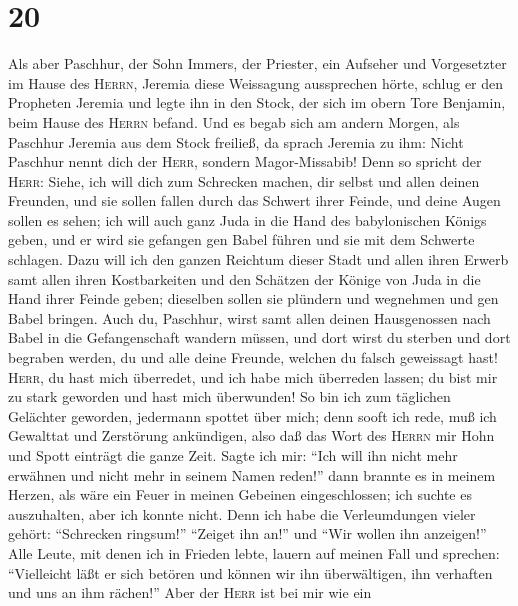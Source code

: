 \hypertarget{section-19}{%
\section{20}\label{section-19}}

 Als aber Paschhur, der Sohn Immers, der Priester, ein
Aufseher und Vorgesetzter im Hause des \textsc{Herrn}, Jeremia diese
Weissagung aussprechen hörte,  schlug er den Propheten
Jeremia und legte ihn in den Stock, der sich im obern Tore Benjamin,
beim Hause des \textsc{Herrn} befand.  Und es begab sich
am andern Morgen, als Paschhur Jeremia aus dem Stock freiließ, da sprach
Jeremia zu ihm: Nicht Paschhur nennt dich der \textsc{Herr}, sondern
Magor-Missabib!  Denn so spricht der \textsc{Herr}: Siehe,
ich will dich zum Schrecken machen, dir selbst und allen deinen
Freunden, und sie sollen fallen durch das Schwert ihrer Feinde, und
deine Augen sollen es sehen; ich will auch ganz Juda in die Hand des
babylonischen Königs geben, und er wird sie gefangen gen Babel führen
und sie mit dem Schwerte schlagen.  Dazu will ich den
ganzen Reichtum dieser Stadt und allen ihren Erwerb samt allen ihren
Kostbarkeiten und den Schätzen der Könige von Juda in die Hand ihrer
Feinde geben; dieselben sollen sie plündern und wegnehmen und gen Babel
bringen.  Auch du, Paschhur, wirst samt allen deinen
Hausgenossen nach Babel in die Gefangenschaft wandern müssen, und dort
wirst du sterben und dort begraben werden, du und alle deine Freunde,
welchen du falsch geweissagt hast!  \textsc{Herr}, du hast
mich überredet, und ich habe mich überreden lassen; du bist mir zu stark
geworden und hast mich überwunden! So bin ich zum täglichen Gelächter
geworden, jedermann spottet über mich;  denn sooft ich
rede, muß ich Gewalttat und Zerstörung ankündigen, also daß das Wort des
\textsc{Herrn} mir Hohn und Spott einträgt die ganze Zeit.
 Sagte ich mir: ``Ich will ihn nicht mehr erwähnen und
nicht mehr in seinem Namen reden!'' dann brannte es in meinem Herzen,
als wäre ein Feuer in meinen Gebeinen eingeschlossen; ich suchte es
auszuhalten, aber ich konnte nicht.  Denn ich habe die
Verleumdungen vieler gehört: ``Schrecken ringsum!'' ``Zeiget ihn an!''
und ``Wir wollen ihn anzeigen!'' Alle Leute, mit denen ich in Frieden
lebte, lauern auf meinen Fall und sprechen: ``Vielleicht läßt er sich
betören und können wir ihn überwältigen, ihn verhaften und uns an ihm
rächen!''  Aber der \textsc{Herr} ist bei mir wie ein
